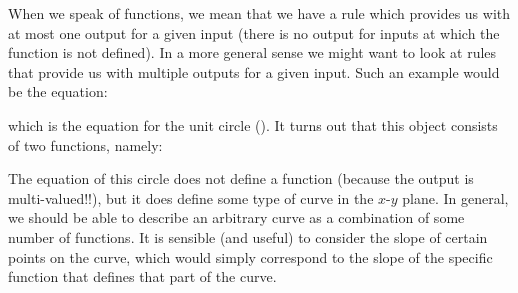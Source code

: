 	When we speak of functions, we mean that we have a rule which provides us with at most one output for a given input (there is no output for inputs at which the function is not defined). In a more general sense we might want to look at rules that provide us with multiple outputs for a given input. Such an example would be the equation:
	
	which is the equation for the unit circle (). It turns out that this object consists of two functions, namely:
	
	The equation of this circle does not define a function (because the output is multi-valued!!), but it does define some type of curve in the $x$-$y$ plane. In general, we should be able to describe an arbitrary curve as a combination of some number of functions. It is sensible (and useful) to consider the slope of certain points on the curve, which would simply correspond to the slope of the specific function that defines that part of the curve. 
	
